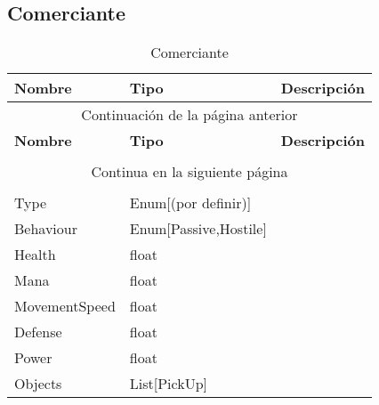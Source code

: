 \subsection{Comerciante}

\begin{longtable}[H]{
    @{}
    l
    l
    l
    @{}
    }%

    \toprule        %
    \textbf{Nombre} & \textbf{Tipo} & \textbf{Descripción} \\      %
    \midrule        %
    \endfirsthead   %

    \multicolumn{3}{c}{Continuación de la página anterior}\\
    \toprule
    \textbf{Nombre} & \textbf{Tipo} & \textbf{Descripción} \\\\      %
    \midrule        %
    \endhead        %

    \midrule
    \multicolumn{3}{c}{Continua en la siguiente página}\\ %
    \endfoot        %

    \bottomrule
    \caption{Comerciante \label{tab:entidad_comerciante}} \\
    \endlastfoot    %

    Type                        & Enum[(por definir)]   & \\
    Behaviour                   & Enum[Passive,Hostile] & \\
    Health                      & float                 & \\
    Mana                        & float                 & \\
    MovementSpeed               & float                 & \\
    Defense                     & float                 & \\
    Power                       & float                 & \\
    Objects                     & List[PickUp]          & \\
\end{longtable}